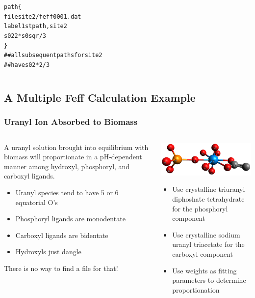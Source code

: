 \documentclass[10pt, xcolor=x11names, compress]{beamer}
\begin{document}
\begin{frame}[fragile]
\begin{columns}[B]
\begin{column}{0.5\linewidth}
\begin{alltt}
  {\color{Purple4}path} \{
     {\color{Gold4}file}    site2/feff0001.dat
     {\color{Gold4}label}   1st path, site 2
     {\color{Gold4}s02}     2 * s0sqr / 3
   \}
  {\color{Blue4}## all subsequent paths for site 2
  ## have} {\color{Gold4}s02}{\color{Blue4} * 2/3}
      \end{alltt}      
    \end{column}
  \end{columns}
\end{frame}

\subsection[Example]{A Multiple Feff Calculation Example}
\begin{frame}
  \frametitle{Uranyl Ion Absorbed to Biomass}

  \begin{columns}[T]
    \begin{column}{0.5\linewidth}
      A uranyl solution brought into equilibrium with biomass will
      proportionate in a pH-dependent manner among hydroxyl,
      phosphoryl, and carboxyl ligands.
      \begin{itemize}
      \item Uranyl species tend to have 5 or 6 equatorial O's
      \item Phosphoryl ligands are monodentate
      \item Carboxyl ligands are bidentate
      \item Hydroxyls just dangle
      \end{itemize}
      \begin{alertblock}{}
        There is no way to find a  file for that!
      \end{alertblock}
    \end{column}
    \begin{column}{0.5\linewidth}
      \quad\includegraphics[width=0.8\linewidth]{mfc/uranyl.png}
      \begin{itemize}
      \item Use crystalline triuranyl diphoshate tetrahydrate for the
        phosphoryl component
      \item Use crystalline sodium uranyl triacetate for the carboxyl
        component 
      \item Use weights as fitting parameters to determine proportionation
      \end{itemize}
    \end{column}
  \end{columns}



\end{frame}
\end{document}
